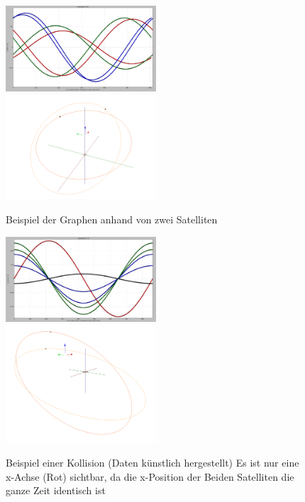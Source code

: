 \begin{figure}[h]
 \centerline{
 \includegraphics[width=0.5\textwidth]{figs/argos_2sat_2D}
 \includegraphics[width=0.5\textwidth]{figs/argos_2sat_3D_w}
 }
 \caption{Beispiel der Graphen anhand von zwei Satelliten}
 \label{fig:argos_2sat}
\end{figure}

\begin{figure}[h]
 \centerline{
 \includegraphics[width=0.5\textwidth]{figs/dummy_2sat_2D}
 \includegraphics[width=0.5\textwidth]{figs/dummy_2sat_3D_w}
 }
 \caption{Beispiel einer Kollision (Daten künstlich hergestellt) \newline Es ist nur eine x-Achse (Rot) sichtbar, da die x-Position der Beiden Satelliten die ganze Zeit identisch ist}
 \label{fig:dummy_2sat}
\end{figure}

